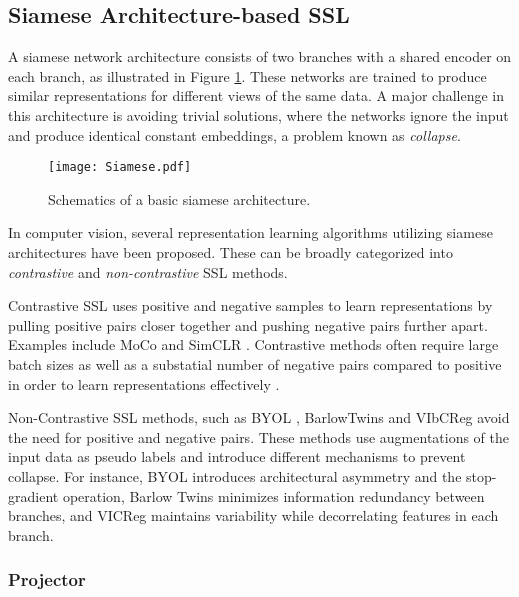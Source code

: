 \documentclass[../../thesis.tex]{subfiles}
\begin{document}
\subsection{Siamese Architecture-based SSL }
A siamese network architecture \cite{siamese} consists of two branches with a shared encoder on each branch, as illustrated in Figure \ref{fig:siamese}. These networks are trained to produce similar representations for different views of the same data. A major challenge in this architecture is avoiding trivial solutions, where the networks ignore the input and produce identical constant embeddings, a problem known as \textit{collapse}.\newline

\begin{figure}[h]
    \centering
    \texttt{[image: Siamese.pdf]}
    \caption{Schematics of a basic siamese architecture.}
    \label{fig:siamese}
\end{figure}

In computer vision, several representation learning algorithms utilizing siamese architectures have been proposed. These can be broadly categorized into \textit{contrastive} and \textit{non-contrastive} SSL methods.\newline

Contrastive SSL uses positive and negative samples to learn representations by pulling positive pairs closer together and pushing negative pairs further apart. Examples include MoCo \cite{he2020momentum} and SimCLR \cite{chen2020simple}. Contrastive methods often require large batch sizes as well as a substatial number of negative pairs compared to positive in order to learn representations effectively \cite{lee2024computer}.\newline

Non-Contrastive SSL methods, such as BYOL \cite{grill2020bootstrap}, BarlowTwins \cite{zbontar2021barlow} and VIbCReg \cite{lee2024computer} avoid the need for positive and negative pairs. These methods use augmentations of the input data as pseudo labels and introduce different mechanisms to prevent collapse. For instance, BYOL introduces architectural asymmetry and the stop-gradient operation, Barlow Twins minimizes information redundancy between branches, and VICReg maintains variability while decorrelating features in each branch.

\subsubsection{Projector}
\end{document}
